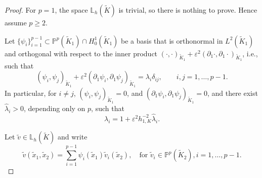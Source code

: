 \documentclass[a4paper,twoside,10pt]{article}
\newcommand{\eps}{\varepsilon}
\newcommand{\IL}{\mathbb{L}}
\newcommand{\IP}{\mathbb{P}}
\numberwithin{equation}{section}
\newcommand{\Kt}{\widetilde{K}}
\newcommand{\hKot}{h_{1,K}}
\begin{document}
	\begin{proof}
	For \(p=1\), the space \(\IL_h(\Kt)\) is trivial, so there is nothing to prove. Hence assume \(p\ge2\).
	
	Let \(\{\psi_i\}_{i=1}^{p-1}\subset \IP^p(\Kt_1)\cap H_0^1(\Kt_1)\) be a basis that is orthonormal in $L^2(\Kt_1)$ and orthogonal with respect to the inner product
$
	(\cdot,\cdot)_{\Kt_1}
	+\eps^2(\partial_1\cdot,\partial_1\cdot)_{\Kt_1}
$,  i.e., such that
	\begin{equation}\label{eq:d1ortho}
	(\psi_i,\psi_j)_{\Kt_1}
	+\eps^2(\partial_1\psi_i,\partial_1\psi_j)_{\Kt_1}
	=\lambda_i\delta_{ij},
	\qquad i,j=1,\dots,p-1.
	\end{equation}
	In particular, for \(i\neq j\),
	$
	(\psi_i,\psi_j)_{\Kt_1}=0$, and
	$(\partial_1\psi_i,\partial_1\psi_j)_{\Kt_1}=0$, and there exist $\widehat\lambda_i>0$, depending only on $p$, such that
	\begin{equation*}
    \lambda_i=1+\eps^2\hKot^{-2}\widehat\lambda_i.
	\end{equation*}
	
	Let \(\tilde v\in \IL_h(\Kt)\) and write
	\begin{equation*}
	\tilde v(\widetilde x_1,\widetilde x_2)=\sum_{i=1}^{p-1}\psi_i(\widetilde x_1)\tilde v_i(\widetilde x_2),
	\quad \text{for }\tilde v_i\in \IP^p(\Kt_2),  i = 1, \ldots, p-1.
	\end{equation*}
	

\end{proof}
\end{document}
